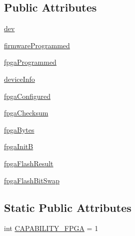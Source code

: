 \subsection*{Public Attributes}
\begin{DoxyCompactItemize}
\item 
\hyperlink{classsoftware_1_1chipwhisperer_1_1capture_1_1scopes_1_1cwhardware_1_1ztex__fwloader_1_1Ztex1v1_aaeaeaeb302885b29639eec0faa341cc3}{dev}
\item 
\hyperlink{classsoftware_1_1chipwhisperer_1_1capture_1_1scopes_1_1cwhardware_1_1ztex__fwloader_1_1Ztex1v1_a5da1040a38ae4f68caac84fd8692eb2c}{firmware\+Programmed}
\item 
\hyperlink{classsoftware_1_1chipwhisperer_1_1capture_1_1scopes_1_1cwhardware_1_1ztex__fwloader_1_1Ztex1v1_a84f87abe78020c30e63bde8ef43491cb}{fpga\+Programmed}
\item 
\hyperlink{classsoftware_1_1chipwhisperer_1_1capture_1_1scopes_1_1cwhardware_1_1ztex__fwloader_1_1Ztex1v1_a3269beb85e0438d44fa35926dd987541}{device\+Info}
\item 
\hyperlink{classsoftware_1_1chipwhisperer_1_1capture_1_1scopes_1_1cwhardware_1_1ztex__fwloader_1_1Ztex1v1_ac022e486e3e33ada7251dce0e648a78d}{fpga\+Configured}
\item 
\hyperlink{classsoftware_1_1chipwhisperer_1_1capture_1_1scopes_1_1cwhardware_1_1ztex__fwloader_1_1Ztex1v1_a1fdb6576c7ebaa67b2a2089b9ce28230}{fpga\+Checksum}
\item 
\hyperlink{classsoftware_1_1chipwhisperer_1_1capture_1_1scopes_1_1cwhardware_1_1ztex__fwloader_1_1Ztex1v1_a6ccea214ffc80a11331abab0c2e32f7c}{fpga\+Bytes}
\item 
\hyperlink{classsoftware_1_1chipwhisperer_1_1capture_1_1scopes_1_1cwhardware_1_1ztex__fwloader_1_1Ztex1v1_a1a090c4efd8ca9dc5fe29bccd77e4aa0}{fpga\+Init\+B}
\item 
\hyperlink{classsoftware_1_1chipwhisperer_1_1capture_1_1scopes_1_1cwhardware_1_1ztex__fwloader_1_1Ztex1v1_a9bcf6fbf1c3b7937e80e76fac413e8a0}{fpga\+Flash\+Result}
\item 
\hyperlink{classsoftware_1_1chipwhisperer_1_1capture_1_1scopes_1_1cwhardware_1_1ztex__fwloader_1_1Ztex1v1_aa258b79d0b42786a2aef78d493d64883}{fpga\+Flash\+Bit\+Swap}
\end{DoxyCompactItemize}
\subsection*{Static Public Attributes}
\begin{DoxyCompactItemize}
\item 
int \hyperlink{classsoftware_1_1chipwhisperer_1_1capture_1_1scopes_1_1cwhardware_1_1ztex__fwloader_1_1Ztex1v1_a6052fb96d805e899a0c386e491ddbf2c}{C\+A\+P\+A\+B\+I\+L\+I\+T\+Y\+\_\+\+F\+P\+G\+A} = 1
\end{DoxyCompactItemize}


